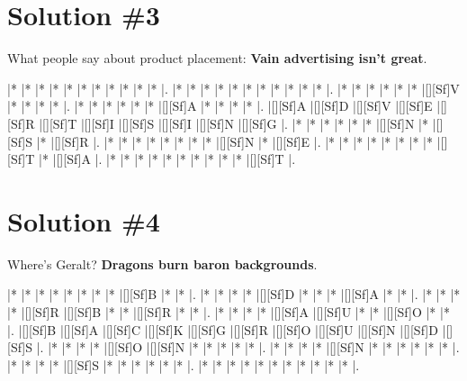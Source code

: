 \documentclass[letterpaper]{article}
\begin{document}
\section*{Solution \#3}
What people say about product placement: \textbf{Vain advertising isn't great}.
\vspace*{1em}
\begin{Puzzle}{11}{9}
|*        |*        |*        |*        |*        |*        |*        |*        |*        |*        |*        |. 
|*        |*        |*        |*        |*        |*        |*        |*        |*        |*        |*        |.  
|*        |*        |*        |*        |*        |*        |[][Sf]V  |*        |*        |*        |*        |.
|*        |*        |*        |*        |*        |*        |[][Sf]A  |*        |*        |*        |*        |.  
|[][Sf]A  |[][Sf]D  |[][Sf]V  |[][Sf]E  |[][Sf]R  |[][Sf]T  |[][Sf]I  |[][Sf]S  |[][Sf]I  |[][Sf]N  |[][Sf]G  |.
|*        |*        |*        |*        |*        |*        |[][Sf]N  |*        |[][Sf]S  |*        |[][Sf]R  |. 
|*        |*        |*        |*        |*        |*        |*        |*        |[][Sf]N  |*        |[][Sf]E  |.
|*        |*        |*        |*        |*        |*        |*        |*        |[][Sf]T  |*        |[][Sf]A  |.
|*        |*        |*        |*        |*        |*        |*        |*        |*        |*        |[][Sf]T  |.
\end{Puzzle}

\newpage

\section*{Solution \#4}
Where's Geralt? \textbf{Dragons burn baron backgrounds}.

\vspace*{1em}
\begin{Puzzle}{11}{9}
|*        |*        |*        |*        |*        |*        |*        |*        |[][Sf]B  |*        |*        |. 
|*        |*        |*        |*        |[][Sf]D  |*        |*        |*        |[][Sf]A  |*        |*        |.  
|*        |*        |*        |*        |[][Sf]R  |[][Sf]B  |*        |*        |[][Sf]R  |*        |*        |.
|*        |*        |*        |*        |[][Sf]A  |[][Sf]U  |*        |*        |[][Sf]O  |*        |*        |.  
|[][Sf]B  |[][Sf]A  |[][Sf]C  |[][Sf]K  |[][Sf]G  |[][Sf]R  |[][Sf]O  |[][Sf]U  |[][Sf]N  |[][Sf]D  |[][Sf]S  |.
|*        |*        |*        |*        |[][Sf]O  |[][Sf]N  |*        |*        |*        |*        |*        |. 
|*        |*        |*        |*        |[][Sf]N  |*        |*        |*        |*        |*        |*        |.
|*        |*        |*        |*        |[][Sf]S  |*        |*        |*        |*        |*        |*        |.
|*        |*        |*        |*        |*        |*        |*        |*        |*        |*        |*        |.
\end{Puzzle}
\end{document}
